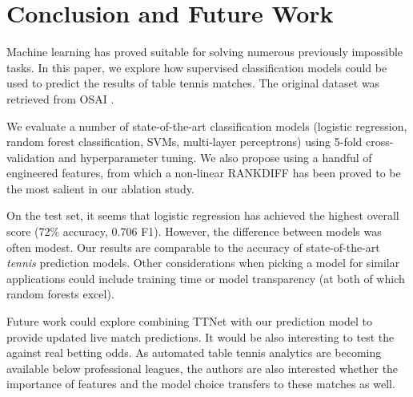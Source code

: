 \section{Conclusion and Future Work} \label{sec:conc}
Machine learning has proved suitable for solving numerous previously impossible tasks. In this paper, we explore how supervised classification models could be used to predict the results of table tennis matches.  The original dataset was retrieved from OSAI \cite{OSAI}.

We evaluate a number of state-of-the-art classification models (logistic regression, random forest classification, SVMs, multi-layer perceptrons) using 5-fold cross-validation and hyperparameter tuning. We also propose using a handful of engineered features, from which a non-linear RANKDIFF has been proved to be the most salient in our ablation study.

On the test set, it seems that logistic regression has achieved the highest overall score (72\% accuracy, 0.706 F1). However, the difference between models was often modest. Our results are comparable to the accuracy of state-of-the-art \textit{tennis} prediction models. Other considerations when picking a model for similar applications could include training time or model transparency (at both of which random forests excel). 

Future work could explore combining TTNet with our prediction model to provide updated live match predictions. It would be also interesting to test the against real betting odds. As automated table tennis analytics are becoming available below professional leagues, the authors are also interested whether the importance of features and the model choice transfers to these matches as well.


